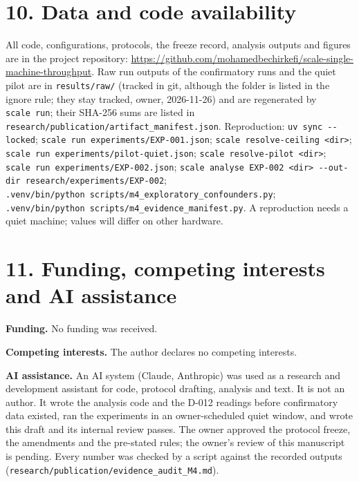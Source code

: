 \documentclass[
]{article}
\begin{document}
\section{10. Data and code
availability}\label{data-and-code-availability}

All code, configurations, protocols, the freeze record, analysis outputs
and figures are in the project repository:
\url{https://github.com/mohamedbechirkefi/scale-single-machine-throughput}.
Raw run outputs of the confirmatory runs and the quiet pilot are in
\texttt{results/raw/} (tracked in git, although the folder is listed in
the ignore rule; they stay tracked, owner, 2026-11-26) and are
regenerated by \texttt{scale\ run}; their SHA-256 sums are listed in
\texttt{research/publication/artifact\_manifest.json}. Reproduction:
\texttt{uv\ sync\ -\/-locked};
\texttt{scale\ run\ experiments/EXP-001.json};
\texttt{scale\ resolve-ceiling\ \textless{}dir\textgreater{}};
\texttt{scale\ run\ experiments/pilot-quiet.json};
\texttt{scale\ resolve-pilot\ \textless{}dir\textgreater{}};
\texttt{scale\ run\ experiments/EXP-002.json};
\texttt{scale\ analyse\ EXP-002\ \textless{}dir\textgreater{}\ -\/-out-dir\ research/experiments/EXP-002};
\texttt{.venv/bin/python\ scripts/m4\_exploratory\_confounders.py};
\texttt{.venv/bin/python\ scripts/m4\_evidence\_manifest.py}. A
reproduction needs a quiet machine; values will differ on other
hardware.

\section{11. Funding, competing interests and AI
assistance}\label{funding-competing-interests-and-ai-assistance}

\textbf{Funding.} No funding was received.

\textbf{Competing interests.} The author declares no competing
interests.

\textbf{AI assistance.} An AI system (Claude, Anthropic) was used as a
research and development assistant for code, protocol drafting, analysis
and text. It is not an author. It wrote the analysis code and the D-012
readings before confirmatory data existed, ran the experiments in an
owner-scheduled quiet window, and wrote this draft and its internal
review passes. The owner approved the protocol freeze, the amendments
and the pre-stated rules; the owner's review of this manuscript is
pending. Every number was checked by a script against the recorded
outputs (\texttt{research/publication/evidence\_audit\_M4.md}).
\end{document}
